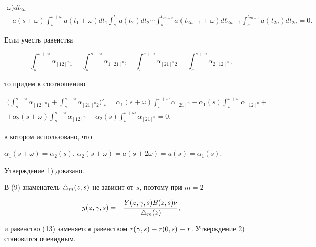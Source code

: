 \begin{pf}
\begin{gather*}
\omega)dt_{2n}-\\


%


-a(s+\omega)


\int_s^{s+\omega}a(t_1+\omega)dt_1


\int_s^{t_1}a(t_2)dt_2\dotsb


\int_s^{t_{2n-2}}a(t_{2n-1}+


\omega)dt_{2n-1}\int_s^{t_{2n-1}}a(t_{2n})dt_{2n}=0.


\end{gather*}





Если учесть равенства


$$


\int_s^{s+\omega}\alpha_{[12]^n1}=\int_s^{s+\omega}\alpha_{1[21]^n},\quad


\int_s^{s+\omega}\alpha_{[21]^n2}=\int_s^{s+\omega}\alpha_{2[12]^n},


$$


то придем к соотношению


\begin{multline*}


\biggl(\int_s^{s+\omega}\alpha_{[12]^n1}+


\int_s^{s+\omega}\alpha_{[21]^n2}\biggr)'_s


=\alpha_1(s+\omega)\int_s^{s+\omega}\alpha_{[21]^n}-


\alpha_1(s)\int_s^{s+\omega}\alpha_{[12]^n}+\\


%


+\alpha_2(s+\omega)\int_s^{s+\omega}\alpha_{[12]^n}-


\alpha_2(s)\int_s^{s+\omega}\alpha_{[21]^n}=0,


\end{multline*}


в котором использовано, что


$\alpha_1(s+\omega)=\alpha_2(s)$, $\alpha_2(s+\omega)=a(s+2\omega)=


a(s)=\alpha_1(s)$.


Утверждение 1) доказано.





В (9) знаменатель $\triangle_m(z,s)$ не зависит от $s$, поэтому при $m=2$


\begin{equation}


y(z,\g,s)=-\frac{Y(z,\g,s)B(z,s)\nu}{\tri_m(z)},


\end{equation}


и равенство (13) заменяется равенством $r(\g,s)\equiv


r(0,s)\equiv r$. Утверждение 2) становится очевидным.


\end{pf}





